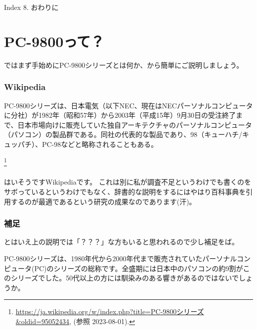 \documentclass[b5paper,9pt,platex,dvipdfmx]{jsarticle}
\begin{document}
\begin{multicols}{3}
\begin{itembox}[l]{Index}
  8. おわりに
  \end{itembox}
\part{PC-9800って？}
ではまず手始めにPC-9800シリーズとは何か、から簡単にご説明しましょう。
\section[short]{Wikipedia}
\begin{screen}
PC-9800シリーズは、日本電気（以下NEC、現在はNECパーソナルコンピュータに分社）が1982年（昭和57年）から2003年（平成15年）9月30日の受注終了まで、日本市場向けに販売していた独自アーキテクチャのパーソナルコンピュータ（パソコン）の製品群である。同社の代表的な製品であり、98（キューハチ/キュッパチ）、PC-98などと略称されることもある。
\end{screen}
\footnote{\url{https://ja.wikipedia.org/w/index.php?title=PC-9800シリーズ&oldid=95052434}, (参照 2023-08-01).}
\\
\\
はいそうですWikipediaです。
これは別に私が調査不足というわけでも書くのをサボっているというわけでもなく、辞書的な説明をするにはやはり百科事典を引用するのが最適であるという研究の成果なのであります(汗)。
\section[short]{補足}
とはいえ上の説明では「？？？」な方もいると思われるので少し補足をば。

PC-9800シリーズは、1980年代から2000年代まで販売されていたパーソナルコンピュータ(PC)のシリーズの総称です。全盛期には日本中のパソコンの約9割がこのシリーズでした。50代以上の方には馴染みのある響きがあるのではないでしょうか。


\end{multicols}
\end{document}
